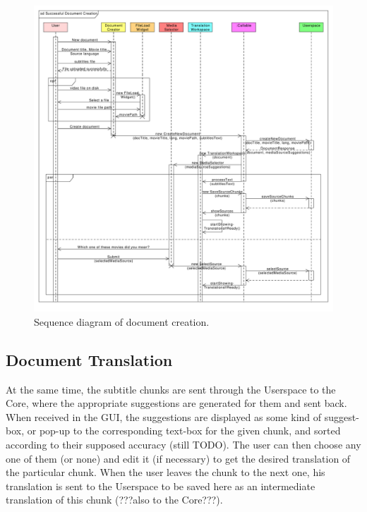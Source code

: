 \begin{figure}[h]
\begin{center}
\includegraphics[scale=0.40]{figures/document_creation_sequence_GUI.pdf}
\end{center}
\caption{Sequence diagram of document creation.}\label{gui:sd:document_creation}
\end{figure}

\subsection{Document Translation}

At the same time, the subtitle chunks are sent through the Userspace to the Core, where the appropriate suggestions are generated for them and sent back. When received in the GUI, the suggestions are displayed as some kind of suggest-box, or pop-up to the corresponding text-box for the given chunk, and sorted according to their supposed accuracy (still TODO). The user can then choose any one of them (or none) and edit it (if necessary) to get the desired translation of the particular chunk. When the user leaves the chunk to the next one, his translation is sent to the Userspace to be saved here as an intermediate translation of this chunk (???also to the Core???).

